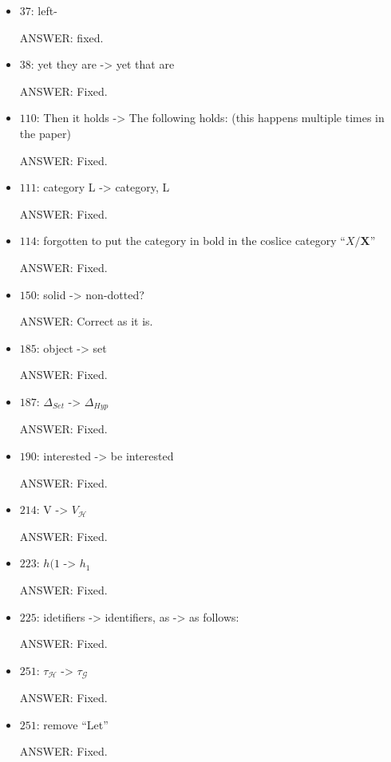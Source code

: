 \documentclass[english,11pt,a4paper]{article}
\begin{document}
\begin{itemize}
\item $37$: left-

ANSWER: fixed.

\item $38$: yet they are -> yet that are

ANSWER: Fixed.

\item $110$: Then it holds -> The following holds: (this happens multiple times in the paper)

ANSWER: Fixed.

\item $111$: category L -> category, L

ANSWER: Fixed.

\item $114$: forgotten to put the category in bold in the coslice category ``$X/ \mathbf{X}$''

ANSWER: Fixed.

\item $150$: solid -> non-dotted?

ANSWER: Correct as it is.

\item $185$: object -> set

ANSWER: Fixed.

\item $187$: $\Delta_{Set}$ -> $\Delta_{Hyp}$

ANSWER: Fixed.

\item $190$: interested -> be interested

ANSWER: Fixed.

\item $214$: V -> $V_\mathcal{H}$

ANSWER: Fixed.

\item $223$: $h(1$ -> $h_1$

ANSWER: Fixed.

\item $225$: idetifiers -> identifiers, as -> as follows:

ANSWER: Fixed.

\item $251$: $\tau_\mathcal{H}$ -> $\tau_\mathcal{G}$

ANSWER: Fixed.

\item $251$: remove ``Let''

ANSWER: Fixed.


\end{itemize}
\end{document}
